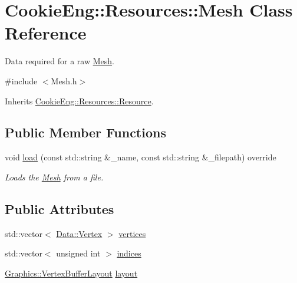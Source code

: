 \hypertarget{struct_cookie_eng_1_1_resources_1_1_mesh}{}\section{Cookie\+Eng\+:\+:Resources\+:\+:Mesh Class Reference}
\label{struct_cookie_eng_1_1_resources_1_1_mesh}


Data required for a raw \hyperlink{struct_cookie_eng_1_1_resources_1_1_mesh}{Mesh}.  




{\ttfamily \#include $<$Mesh.\+h$>$}



Inherits \hyperlink{class_cookie_eng_1_1_resources_1_1_resource}{Cookie\+Eng\+::\+Resources\+::\+Resource}.

\subsection*{Public Member Functions}
\begin{DoxyCompactItemize}
\item 
void \hyperlink{struct_cookie_eng_1_1_resources_1_1_mesh_ae31053c6edaf0e735d85350bfa6093fb}{load} (const std\+::string \&\+\_\+name, const std\+::string \&\+\_\+filepath) override
\begin{DoxyCompactList}\small\item\em Loads the \hyperlink{struct_cookie_eng_1_1_resources_1_1_mesh}{Mesh} from a file. \end{DoxyCompactList}\end{DoxyCompactItemize}
\subsection*{Public Attributes}
\begin{DoxyCompactItemize}
\item 
std\+::vector$<$ \hyperlink{struct_cookie_eng_1_1_data_1_1_vertex}{Data\+::\+Vertex} $>$ \hyperlink{struct_cookie_eng_1_1_resources_1_1_mesh_aa2d9365b3bb9855de51053a1bbde84a1}{vertices}
\item 
std\+::vector$<$ unsigned int $>$ \hyperlink{struct_cookie_eng_1_1_resources_1_1_mesh_a78ad4658bc848293472999b4708b85ab}{indices}
\item 
\hyperlink{class_cookie_eng_1_1_graphics_1_1_vertex_buffer_layout}{Graphics\+::\+Vertex\+Buffer\+Layout} \hyperlink{struct_cookie_eng_1_1_resources_1_1_mesh_a7d60f959cc5a9cadbc59299e207032f2}{layout}
\end{DoxyCompactItemize}
